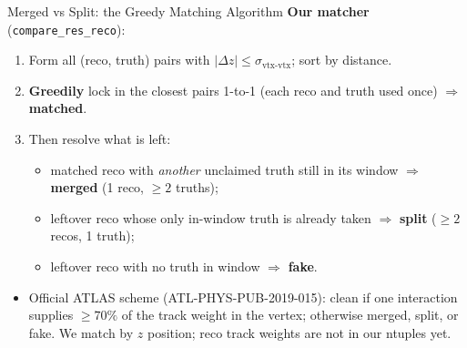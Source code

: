 \documentclass[xcolor=table,aspectratio=169]{beamer}
\begin{document}
\begin{frame}{Merged vs Split: the Greedy Matching Algorithm}
    \textbf{Our matcher} (\texttt{compare\_res\_reco}):
    \begin{enumerate}\setlength\itemsep{0.4em}
        \item Form all (reco, truth) pairs with
        \(|\Delta z| \le \sigma_{\text{vtx-vtx}}\); sort by distance.
        \item \textbf{Greedily} lock in the closest pairs 1-to-1 (each reco and
        truth used once) \(\Rightarrow\) \textbf{matched}.
        \item Then resolve what is left:
        \begin{itemize}\setlength\itemsep{0.15em}
            \item matched reco with \emph{another} unclaimed truth still in its
            window \(\Rightarrow\) \textbf{merged} (1 reco, \(\geq 2\) truths);
            \item leftover reco whose only in-window truth is already taken
            \(\Rightarrow\) \textbf{split} (\(\geq 2\) recos, 1 truth);
            \item leftover reco with no truth in window \(\Rightarrow\) \textbf{fake}.
        \end{itemize}
    \end{enumerate}
    \vspace{0.8em}
    \begin{itemize}
        \item Official ATLAS scheme (ATL-PHYS-PUB-2019-015): clean if one interaction
        supplies \(\geq 70\%\) of the track weight in the vertex; otherwise merged,
        split, or fake. We match by \(z\) position; reco track weights are not in our
        ntuples yet.
    \end{itemize}
\end{frame}

\end{document}

